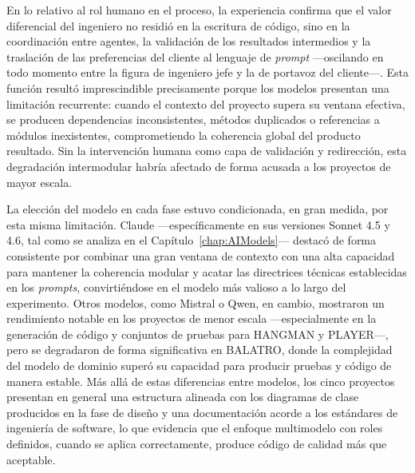 En lo relativo al rol humano en el proceso, la experiencia confirma que el valor diferencial del ingeniero no residió en la escritura de código, sino en la coordinación entre agentes, la validación de los resultados intermedios y la traslación de las preferencias del cliente al lenguaje de \textit{prompt} —oscilando en todo momento entre la figura de ingeniero jefe y la de portavoz del cliente—. Esta función resultó imprescindible precisamente porque los modelos presentan una limitación recurrente: cuando el contexto del proyecto supera su ventana efectiva, se producen dependencias inconsistentes, métodos duplicados o referencias a módulos inexistentes, comprometiendo la coherencia global del producto resultado. Sin la intervención humana como capa de validación y redirección, esta degradación intermodular habría afectado de forma acusada a los proyectos de mayor escala.

La elección del modelo en cada fase estuvo condicionada, en gran medida, por esta misma limitación. Claude ---específicamente en sus versiones Sonnet 4.5 y 4.6, tal como se analiza en el Capítulo~\ref{chap:AIModels}--- destacó de forma consistente por combinar una gran ventana de contexto con una alta capacidad para mantener la coherencia modular y acatar las directrices técnicas establecidas en los \textit{prompts}, convirtiéndose en el modelo más valioso a lo largo del experimento. Otros modelos, como Mistral o Qwen, en cambio, mostraron un rendimiento notable en los proyectos de menor escala ---especialmente en la generación de código y conjuntos de pruebas para \ac{HANGMAN} y \ac{PLAYER}---, pero se degradaron de forma significativa en \ac{BALATRO}, donde la complejidad del modelo de dominio superó su capacidad para producir pruebas y código de manera estable. Más allá de estas diferencias entre modelos, los cinco proyectos presentan en general una estructura alineada con los diagramas de clase producidos en la fase de diseño y una documentación acorde a los estándares de ingeniería de software, lo que evidencia que el enfoque multimodelo con roles definidos, cuando se aplica correctamente, produce código de calidad más que aceptable.

